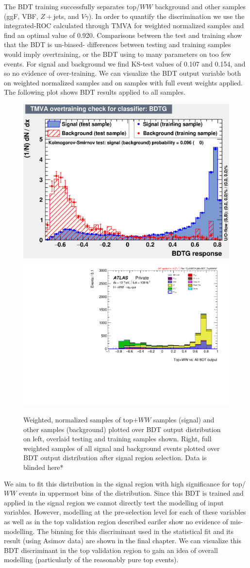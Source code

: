 The BDT training successfully separates top/$WW$ background and other samples (ggF, VBF, $Z+$jets, and $V\gamma$). In order to quantify the discrimination we use the integrated-ROC calculated through TMVA for weighted normalized samples and find an optimal value of 0.920. Comparisons between the test and training show that the BDT is un-biased- differences between testing and training samples would imply overtraining, or the BDT using to many parameters on too few events. For signal and background we find KS-test values of 0.107 and 0.154, and so no evidence of over-training. We can visualize the BDT output variable both on weighted normalized samples and on samples with full event weights applied. The following plot shows BDT results applied to all samples.

\begin{figure}[!htbp]
\centering
  \includegraphics[width=.4\linewidth]{Pictures/Top+WWvsEverything/overtrain_BDTG.eps}
  \includegraphics[width=.45\linewidth]{Pictures/run2-emme-CutVBFDYjjMin-BDT_TopWWAll-lin.pdf}
\caption{Weighted, normalized samples of top$+WW$ samples (signal) and other samples (background) plotted over BDT output distribution on left, overlaid testing and training samples shown. Right, full weighted samples of all signal and background events plotted over BDT output distribution after signal region selection. Data is blinded here*}
\label{fig:TopBDTresult}
\end{figure}

We aim to fit this distribution in the signal region with high significance for top/$WW$ events in uppermost bins of the distribution. Since this BDT is trained and applied in the signal region we cannot directly test the modelling of input variables. However, modelling at the pre-selection level for each of these variables as well as in the top validation region described eariler show no evidence of mis-modelling. The binning for this discriminant used in the statistical fit and its result (using Asimov data) are shown in the final chapter. We can visualize this BDT discriminant in the top validation region to gain an idea of overall modelling (particularly of the reasonably pure top events).

